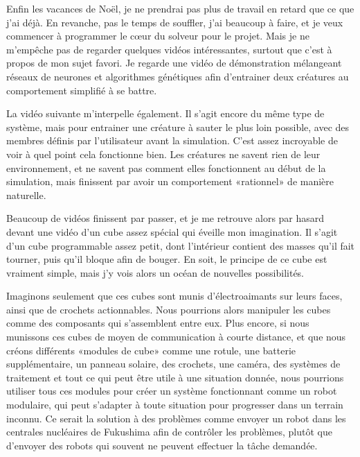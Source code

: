 \documentclass[12pt,final]{report} %
\begin{document}
\begin{cursive}
{

Enfin les vacances de Noël, je ne prendrai pas plus de travail en retard que ce que j'ai déjà. 
En revanche, pas le temps de souffler, j'ai beaucoup à faire, et je veux commencer à programmer le c\oe{}ur du solveur pour le projet.
Mais je ne m'empêche pas de regarder quelques vidéos intéressantes, surtout que c'est à propos de mon sujet favori.
Je regarde une vidéo de démonstration mélangeant réseaux de neurones et algorithmes génétiques afin d'entrainer deux créatures au comportement simplifié à se battre.

La vidéo suivante m'interpelle également.
Il s'agit encore du même type de système, mais pour entrainer une créature à sauter le plus loin possible, avec des membres définis par l'utilisateur avant la simulation.
C'est assez incroyable de voir à quel point cela fonctionne bien.
Les créatures ne savent rien de leur environnement, et ne savent pas comment elles fonctionnent au début de la simulation, mais finissent par avoir un comportement «rationnel» de manière naturelle.


Beaucoup de vidéos finissent par passer, et je me retrouve alors par hasard devant une vidéo d'un cube assez spécial qui éveille mon imagination. 
Il s'agit d'un cube programmable assez petit, dont l'intérieur contient des masses qu'il fait tourner, puis qu'il bloque afin de bouger.%
En soit, le principe de ce cube est vraiment simple, mais j'y vois alors un océan de nouvelles possibilités.

Imaginons seulement que ces cubes sont munis d'électroaimants sur leurs faces, ainsi que de crochets actionnables. 
Nous pourrions alors manipuler les cubes comme des composants qui s'assemblent entre eux.
Plus encore, si nous munissons ces cubes de moyen de communication à courte distance, et que nous créons différents «modules de cube» comme une rotule, une batterie supplémentaire, un panneau solaire, des crochets, une caméra, des systèmes de traitement et tout ce qui peut être utile à une situation donnée, nous pourrions utiliser tous ces modules pour créer un système fonctionnant comme un robot modulaire, qui peut s'adapter à toute situation pour progresser dans un terrain inconnu.
Ce serait la solution à des problèmes comme envoyer un robot dans les centrales nucléaires de Fukushima afin de contrôler les problèmes, plutôt que d'envoyer des robots qui souvent ne peuvent effectuer la tâche demandée.

}
\end{cursive}
\end{document}
